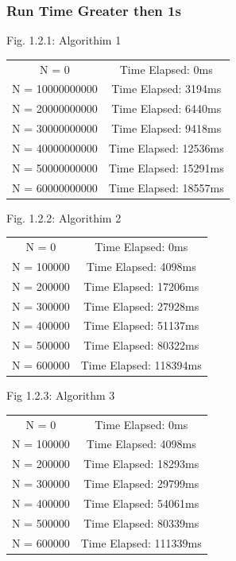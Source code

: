 \documentclass[11pt]{article} %
\begin{document}
\subsubsection{Run Time Greater then 1s}
\begin{center}
Fig. 1.2.1: Algorithim 1
\begin{tabular} { |c|c| }
\hline
N = 0&Time Elapsed: 0ms \\
N = 10000000000&Time Elapsed: 3194ms \\
N = 20000000000&Time Elapsed: 6440ms \\
N = 30000000000&Time Elapsed: 9418ms \\
N = 40000000000&Time Elapsed: 12536ms \\
N = 50000000000&Time Elapsed: 15291ms \\
N = 60000000000&Time Elapsed: 18557ms \\
\hline
\end{tabular}
\end{center}

\begin{center}
Fig. 1.2.2: Algorithim 2
\begin{tabular} { |c|c| }
\hline
N = 0&Time Elapsed: 0ms     \\
N = 100000&Time Elapsed: 4098ms \\
N = 200000&Time Elapsed: 17206ms \\ 
N = 300000&Time Elapsed: 27928ms \\
N = 400000&Time Elapsed: 51137ms \\ 
N = 500000&Time Elapsed: 80322ms \\
N = 600000&Time Elapsed: 118394ms \\
\hline
\end{tabular}
\end{center}

\begin{center}
Fig 1.2.3: Algorithm 3
\begin{tabular} { |c|c| }
\hline
N = 0&Time Elapsed: 0ms \\
N = 100000&Time Elapsed: 4098ms \\
N = 200000&Time Elapsed: 18293ms \\
N = 300000&Time Elapsed: 29799ms \\
N = 400000&Time Elapsed: 54061ms \\
N = 500000&Time Elapsed: 80339ms \\
N = 600000&Time Elapsed: 111339ms \\
\hline
\end{tabular}
\end{center}
\par
\end{document}
